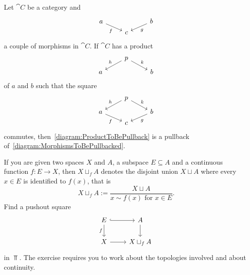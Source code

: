 \begin{lemma}
  Let \(\cat C\) be a category and
  \begin{equation}\begin{tikzcd}[row sep=tiny]
      a \ar["f", dr, swap] &   & b \ar["g", dl] \\
      & c &
    \end{tikzcd}\label{diagram:MorphismsToBePullbacked}\end{equation}
  a couple of morphisms in \(\cat C\). If \(\cat C\) has a product
  \begin{equation}\begin{tikzcd}[row sep=tiny]
      & p \ar["h", dl, swap] \ar["k", dr] &   \\
      a & & b
    \end{tikzcd}\label{diagram:ProductToBePullback}\end{equation}
  of \(a\) and \(b\) such that the square
  \[\begin{tikzcd}[row sep=tiny]
      & p \ar["h", dl, swap] \ar["k", dr] &   \\
      a \ar["f", dr, swap] &   & b \ar["g", dl] \\
      & c &
    \end{tikzcd}\] commutes, then~\eqref{diagram:ProductToBePullback}
  is a pullback of~\eqref{diagram:MorphismsToBePullbacked}.
\end{lemma}

\begin{exercise}
  If you are given two spaces \(X\) and \(A\), a subspace
  \(E \subseteq A\) and a continuous function \(f : E \to X\), then
  \(X \sqcup_f A\) denotes the disjoint union \(X \sqcup A\) where every
  \(x \in E\) is identified to \(f(x)\), that
  is%
  \[X \sqcup_f A := \frac{X \sqcup A}{x \sim f(x) \text{ for } x \in E} .\] Find a
  pushout square
  \[\begin{tikzcd}
      E \ar[r, hookrightarrow] \ar["f", d, swap] & A \ar[d]     \\
      X \ar[r] & X \sqcup_f A
    \end{tikzcd}\] in \(\Top\). The exercise requires you to work
  about the topologies involved and about continuity.
\end{exercise}

